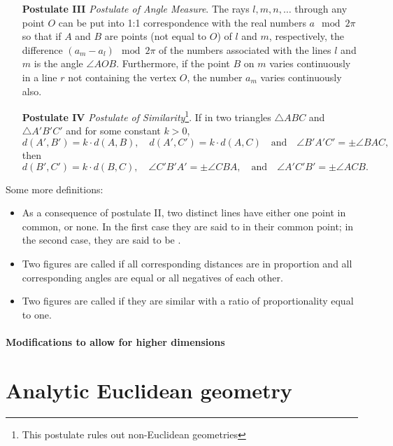 \begin{enumerate}
\item[\textbf{Postulate III}] \textit{Postulate of Angle Measure}. The rays {$l, m, n, \ldots$} through any point $O$ can be put into 1:1 correspondence with the real numbers $a \mod 2\pi$ so that if $A$ and $B$ are points (not equal to $O$) of $l$ and $m$, respectively, the difference $(a_m - a_l) \mod 2\pi$ of the numbers associated with the lines $l$ and $m$ is the angle $\angle AOB$. Furthermore, if the point $B$ on $m$ varies continuously in a line $r$ not containing the vertex $O$, the number $a_m$ varies continuously also. 
\item[\textbf{Postulate IV}] \textit{Postulate of Similarity}\footnote{This postulate rules out non-Euclidean geometries}. If in two triangles $\triangle ABC$ and $\triangle A'B'C'$  and for some constant $k > 0$,
\[d(A', B' ) = k\cdot d(A, B), \quad d(A', C' ) = k\cdot d(A, C) \quad \text{and} \quad \angle B'A'C'  = \pm \angle BAC, \]
then
\[d(B', C' ) = k\cdot d(B, C), \quad \angle  C'B'A'  = \pm \angle CBA, \quad \text{and}\quad  \angle A'C'B'  = \pm \angle ACB. \]
\end{enumerate}

\begin{definition}
Some more definitions:
\begin{itemize}
\item As a consequence of postulate II, two distinct lines have either one point in common, or none. In the first case they are said to  in their common point; in the second case, they are said to be .
\item Two figures are called  if all corresponding distances are in proportion and all corresponding angles are equal or all negatives of each other.
\item Two figures are called  if they are similar with a ratio of proportionality equal to one.
\end{itemize}
\end{definition}

\paragraph{Modifications to allow for higher dimensions}

\section{Analytic Euclidean geometry}

